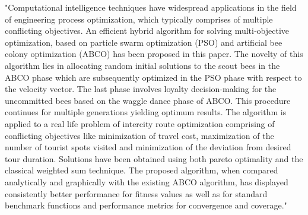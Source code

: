\documentclass[a4paper,11pt]{article}
\begin{document}
"Computational intelligence techniques have widespread applications in the field of engineering process optimization, which typically comprises of multiple conflicting objectives. An efficient hybrid algorithm for solving multi‐objective optimization, based on particle swarm optimization (PSO) and artificial bee colony optimization (ABCO) has been proposed in this paper. The novelty of this algorithm lies in allocating random initial solutions to the scout bees in the ABCO phase which are subsequently optimized in the PSO phase with respect to the velocity vector. The last phase involves loyalty decision‐making for the uncommitted bees based on the waggle dance phase of ABCO. This procedure continues for multiple generations yielding optimum results. The algorithm is applied to a real life problem of intercity route optimization comprising of conflicting objectives like minimization of travel cost, maximization of the number of tourist spots visited and minimization of the deviation from desired tour duration. Solutions have been obtained using both pareto optimality and the classical weighted sum technique. The proposed algorithm, when compared analytically and graphically with the existing ABCO algorithm, has displayed consistently better performance for fitness values as well as for standard benchmark functions and performance metrics for convergence and coverage."\cite{beed2020hybrid}






\newpage
\end{document}
